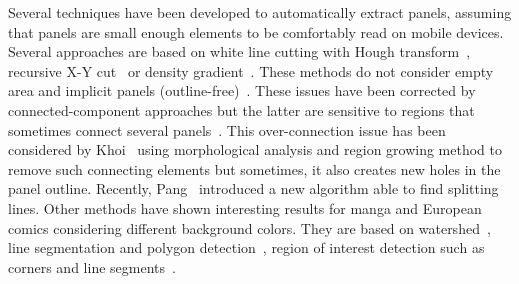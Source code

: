 \documentclass[conference]{IEEEtran}
\begin{document}

  Several techniques have been developed to automatically extract panels, assuming that panels are small enough elements to be comfortably read on mobile devices.
  Several approaches are based on white line cutting with Hough transform~\cite{li2012automatic}, recursive X-Y cut~\cite{Han07} or density gradient~\cite{Tan07}.
  These methods do not consider empty area and implicit panels (outline-free)~\cite{In11}.
  These issues have been corrected by connected-component approaches but the latter are sensitive to regions that sometimes connect several panels~\cite{Rigaud2012LNCS}.
  This over-connection issue has been considered by Khoi~\cite{Khoi11} using morphological analysis and region growing method to remove such connecting elements but sometimes, it also creates new holes in the panel outline.
  Recently, Pang~\cite{Pang2014Robust} introduced a new algorithm able to find splitting lines.
  Other methods have shown interesting results for manga and European comics considering different background colors.
  They are based on watershed~\cite{ponsard2012ocr}, line segmentation and polygon detection~\cite{Luyuan2014Automatic}, region of interest detection such as corners and line segments~\cite{stommel2012segmentation}.

\end{document}
